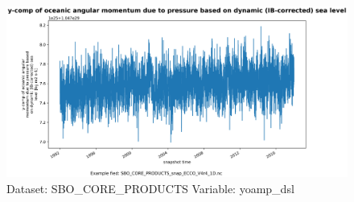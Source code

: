 \begin{figure}[H]
\centering
\includegraphics[width=\textwidth]{../images/plots/oneD_plots/SBO_Core_Products/yoamp_dsl.png}
\caption{Dataset: SBO\_CORE\_PRODUCTS Variable: yoamp\_dsl}
\label{tab:table-SBO_CORE_PRODUCTS_yoamp_dsl-Plot}
\end{figure}
\pagebreak
